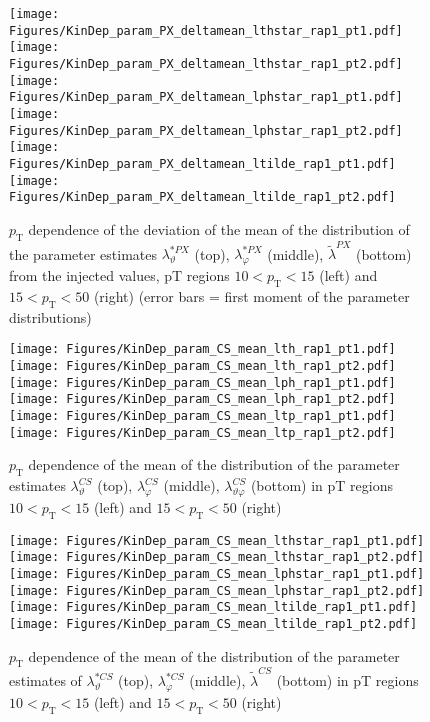 \documentclass[12pt]{article}
\newcommand{\pT}{p_\mathrm{T}}
\newcommand{\lamthCS}{\lambda^{\scriptscriptstyle CS}_\vartheta}
\newcommand{\lamphCS}{\lambda^{\scriptscriptstyle CS}_\varphi}
\newcommand{\lamthphCS}{\lambda^{\scriptscriptstyle CS}_{\vartheta \varphi}}
\newcommand{\lamtildeCS}{\tilde{\lambda}^{\scriptscriptstyle CS}}
\newcommand{\lamthstarCS}{\lambda^{* \scriptscriptstyle CS}_\vartheta}
\newcommand{\lamphstarCS}{\lambda^{* \scriptscriptstyle CS}_\varphi}
\newcommand{\lamtildePX}{\tilde{\lambda}^{\scriptscriptstyle PX}}
\newcommand{\lamthstarPX}{\lambda^{* \scriptscriptstyle PX}_\vartheta}
\newcommand{\lamphstarPX}{\lambda^{* \scriptscriptstyle PX}_\varphi}
\begin{document}
\begin{figure}[htbp]
\centering
\texttt{[image: Figures/KinDep\_param\_PX\_deltamean\_lthstar\_rap1\_pt1.pdf]}
\texttt{[image: Figures/KinDep\_param\_PX\_deltamean\_lthstar\_rap1\_pt2.pdf]}
\texttt{[image: Figures/KinDep\_param\_PX\_deltamean\_lphstar\_rap1\_pt1.pdf]}
\texttt{[image: Figures/KinDep\_param\_PX\_deltamean\_lphstar\_rap1\_pt2.pdf]}
\texttt{[image: Figures/KinDep\_param\_PX\_deltamean\_ltilde\_rap1\_pt1.pdf]}
\texttt{[image: Figures/KinDep\_param\_PX\_deltamean\_ltilde\_rap1\_pt2.pdf]}
\caption{$\pT$ dependence of the deviation of the mean of the distribution of
the parameter estimates $\lamthstarPX$ (top), $\lamphstarPX$ (middle),
$\lamtildePX$ (bottom) from the injected values, pT regions $10<\pT<15$ (left) and $15<\pT<50$ (right) (error bars = first moment of
the parameter distributions)}
\end{figure}
\clearpage










\begin{figure}[htbp]
\centering
\texttt{[image: Figures/KinDep\_param\_CS\_mean\_lth\_rap1\_pt1.pdf]}
\texttt{[image: Figures/KinDep\_param\_CS\_mean\_lth\_rap1\_pt2.pdf]}
\texttt{[image: Figures/KinDep\_param\_CS\_mean\_lph\_rap1\_pt1.pdf]}
\texttt{[image: Figures/KinDep\_param\_CS\_mean\_lph\_rap1\_pt2.pdf]}
\texttt{[image: Figures/KinDep\_param\_CS\_mean\_ltp\_rap1\_pt1.pdf]}
\texttt{[image: Figures/KinDep\_param\_CS\_mean\_ltp\_rap1\_pt2.pdf]}
\caption{$\pT$ dependence of the mean of the distribution of the parameter estimates $\lamthCS$ (top), $\lamphCS$ (middle), $\lamthphCS$ (bottom) in pT regions $10<\pT<15$ (left) and $15<\pT<50$ (right)}
\end{figure}
\clearpage

\begin{figure}[htbp]
\centering
\texttt{[image: Figures/KinDep\_param\_CS\_mean\_lthstar\_rap1\_pt1.pdf]}
\texttt{[image: Figures/KinDep\_param\_CS\_mean\_lthstar\_rap1\_pt2.pdf]}
\texttt{[image: Figures/KinDep\_param\_CS\_mean\_lphstar\_rap1\_pt1.pdf]}
\texttt{[image: Figures/KinDep\_param\_CS\_mean\_lphstar\_rap1\_pt2.pdf]}
\texttt{[image: Figures/KinDep\_param\_CS\_mean\_ltilde\_rap1\_pt1.pdf]}
\texttt{[image: Figures/KinDep\_param\_CS\_mean\_ltilde\_rap1\_pt2.pdf]}
\caption{$\pT$ dependence of the mean of the distribution of the parameter estimates of $\lamthstarCS$ (top), $\lamphstarCS$ (middle), $\lamtildeCS$ (bottom) in pT regions $10<\pT<15$ (left) and $15<\pT<50$ (right)}
\end{figure}
\clearpage
\end{document}
